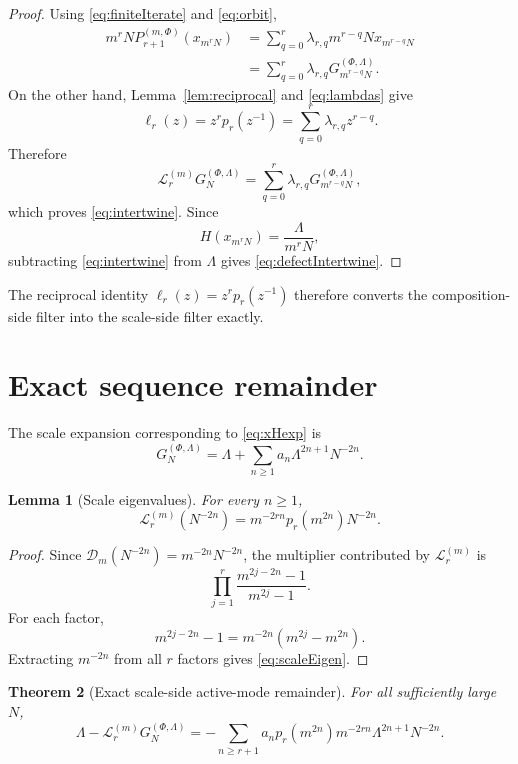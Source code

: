 \documentclass[11pt]{article}
\newtheorem{theorem}{Theorem}[section]
\newtheorem{lemma}[theorem]{Lemma}
\theoremstyle{remark}
\newcommand{\D}{\mathcal D}
\newcommand{\Lop}{\mathcal L}
\begin{document}
\begin{proof}
Using \eqref{eq:finiteIterate} and \eqref{eq:orbit},
\begin{align*}
m^rN P_{r+1}^{(m,\Phi)}(x_{m^rN})
&=
\sum_{q=0}^r
\lambda_{r,q}
m^{r-q}N x_{m^{r-q}N}
\\
&=
\sum_{q=0}^r
\lambda_{r,q}
G_{m^{r-q}N}^{(\Phi,\Lambda)}.
\end{align*}
On the other hand, Lemma~\ref{lem:reciprocal} and
\eqref{eq:lambdas} give
\[
\ell_r(z)
=
z^rp_r(z^{-1})
=
\sum_{q=0}^r\lambda_{r,q}z^{r-q}.
\]
Therefore
\[
\Lop_r^{(m)}G_N^{(\Phi,\Lambda)}
=
\sum_{q=0}^r
\lambda_{r,q}
G_{m^{r-q}N}^{(\Phi,\Lambda)},
\]
which proves \eqref{eq:intertwine}.  Since
\[
H(x_{m^rN})=\frac{\Lambda}{m^rN},
\]
subtracting \eqref{eq:intertwine} from \(\Lambda\) gives
\eqref{eq:defectIntertwine}.
\end{proof}

The reciprocal identity \(\ell_r(z)=z^rp_r(z^{-1})\) therefore converts
the composition-side filter into the scale-side filter exactly.

\section{Exact sequence remainder}

The scale expansion corresponding to \eqref{eq:xHexp} is
\begin{equation}
G_N^{(\Phi,\Lambda)}
=
\Lambda+
\sum_{n\ge1}
a_n\Lambda^{2n+1}N^{-2n}.
\label{eq:Gexp}
\end{equation}

\begin{lemma}[Scale eigenvalues]
\label{lem:scaleEigen}
For every \(n\ge1\),
\begin{equation}
\boxed{
\Lop_r^{(m)}(N^{-2n})
=
m^{-2rn}p_r(m^{2n})N^{-2n}.
}
\label{eq:scaleEigen}
\end{equation}
\end{lemma}

\begin{proof}
Since \(\D_m(N^{-2n})=m^{-2n}N^{-2n}\), the multiplier contributed by
\(\Lop_r^{(m)}\) is
\[
\prod_{j=1}^r
\frac{m^{2j-2n}-1}{m^{2j}-1}.
\]
For each factor,
\[
m^{2j-2n}-1
=
m^{-2n}(m^{2j}-m^{2n}).
\]
Extracting \(m^{-2n}\) from all \(r\) factors gives
\eqref{eq:scaleEigen}.
\end{proof}

\begin{theorem}[Exact scale-side active-mode remainder]
\label{thm:sequenceExact}
For all sufficiently large \(N\),
\begin{equation}
\boxed{
\Lambda-
\Lop_r^{(m)}G_N^{(\Phi,\Lambda)}
=
-\sum_{n\ge r+1}
a_n p_r(m^{2n})m^{-2rn}
\Lambda^{2n+1}N^{-2n}.
}
\label{eq:sequenceExact}
\end{equation}
\end{theorem}
\end{document}
